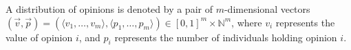 \documentclass[preview]{standalone}
\begin{document}
\begin{center}
A distribution of opinions is denoted by a pair of $m$-dimensional vectors 
                   $(\vec{v},\vec{p}) = (\langle v_1,\ldots,v_m \rangle,\langle p_1,\ldots,p_m \rangle) \in [0,1]^m \times \mathbb{N}^m$, 
                   where $v_i$ represents the value of opinion $i$, and $p_i$ represents the 
                   number of individuals holding opinion $i$.
\end{center}
\end{document}
